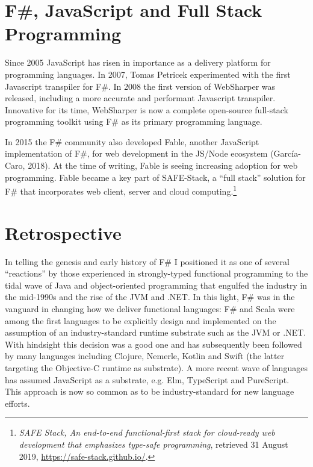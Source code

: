 \documentclass[acmsmall,review]{acmart}\settopmatter{printfolios=true,printccs=false,printacmref=false}
\begin{document}
\section*{F\#, JavaScript and Full Stack Programming}

Since 2005 JavaScript has risen in importance as a delivery platform for programming languages. In 2007, Tomas Petricek
experimented with the first Javascript transpiler for F\#. In 2008 the first version of WebSharper was released, including
a more accurate and performant Javascript transpiler.  Innovative for its time, WebSharper is now a complete
open-source full-stack programming toolkit using F\# as its primary programming language.

In 2015 the F\# community also developed Fable, another JavaScript implementation of F\#, for web development
in the JS/Node ecosystem (García-Caro, 2018). At the time of writing, Fable is seeing increasing adoption for web
programming.  Fable became a key part of SAFE-Stack, a “full stack” solution for F\# that incorporates web client, server and cloud
computing.\footnote{\textit{SAFE Stack, An end-to-end functional-first stack for cloud-ready web development that emphasizes type-safe programming}, retrieved 31 August 2019,  \url{https://safe-stack.github.io/}.}


\section*{Retrospective}

In telling the genesis and early history of F\# I positioned it as one of several “reactions” by those experienced
in strongly-typed functional programming to the tidal wave of Java and object-oriented programming that
engulfed the industry in the mid-1990s and the rise of the JVM and .NET.  In this light, F\# was in the vanguard
in changing how we deliver functional languages: F\# and Scala were among the first languages to be explicitly
design and implemented on the assumption of an industry-standard runtime substrate such as the JVM or .NET.
With hindsight this decision was a good one and has subsequently been followed by many languages including
Clojure, Nemerle, Kotlin and Swift (the latter targeting the Objective-C runtime as substrate). A more recent
wave of languages has assumed JavaScript as a substrate, e.g. Elm, TypeScript and PureScript.  This approach is
now so common as to be industry-standard for new language efforts.
\end{document}
